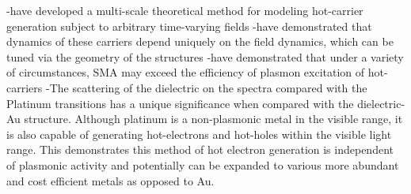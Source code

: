 \documentclass[journal=jpclcd,manuscript=letter]{achemso}
\begin{document}

-have developed a multi-scale theoretical method for modeling hot-carrier generation subject to arbitrary time-varying fields
-have demonstrated that dynamics of these carriers depend uniquely on the field dynamics, which can be tuned via the geometry of the structures
-have demonstrated that under a variety of circumstances, SMA may exceed the efficiency of plasmon excitation of hot-carriers
-The scattering of the dielectric on the spectra compared with the Platinum transitions has a unique significance when 
compared with the dielectric-Au structure. Although platinum is a non-plasmonic metal in the visible range, it is also 
capable of generating hot-electrons and hot-holes within the visible light range. This demonstrates this method of 
hot electron generation is independent of plasmonic activity and potentially can be expanded to various more abundant and cost efficient metals as opposed to Au. 

\end{document}
